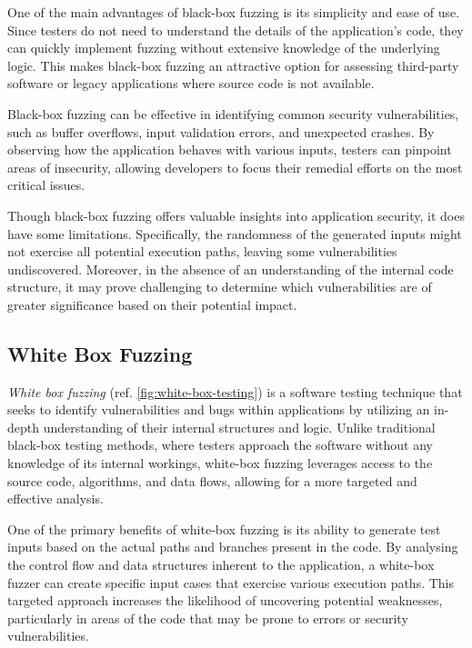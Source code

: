 One of the main advantages of black-box fuzzing is its simplicity and ease of use. Since testers do not need to understand the details of the application’s code, they can quickly implement fuzzing without extensive knowledge of the underlying logic. This makes black-box fuzzing an attractive option for assessing third-party software or legacy applications where source code is not available.

Black-box fuzzing can be effective in identifying common security vulnerabilities, such as buffer overflows, input validation errors, and unexpected crashes. By observing how the application behaves with various inputs, testers can pinpoint areas of insecurity, allowing developers to focus their remedial efforts on the most critical issues.

Though black-box fuzzing offers valuable insights into application security, it does have some limitations. Specifically, the randomness of the generated inputs might not exercise all potential execution paths, leaving some vulnerabilities undiscovered. Moreover, in the absence of an understanding of the internal code structure, it may prove challenging to determine which vulnerabilities are of greater significance based on their potential impact.
 \cite{godefroid_random_2007}

\subsection{White Box Fuzzing}
\label{sec:white-box}
\textit{White box fuzzing} (ref. \autoref{fig:white-box-testing}) is a software testing technique that seeks to identify vulnerabilities and bugs within applications by utilizing an in-depth understanding of their internal structures and logic. Unlike traditional black-box testing methods, where testers approach the software without any knowledge of its internal workings, white-box fuzzing leverages access to the source code, algorithms, and data flows, allowing for a more targeted and effective analysis.

One of the primary benefits of white-box fuzzing is its ability to generate test inputs based on the actual paths and branches present in the code. By analysing the control flow and data structures inherent to the application, a white-box fuzzer can create specific input cases that exercise various execution paths. This targeted approach increases the likelihood of uncovering potential weaknesses, particularly in areas of the code that may be prone to errors or security vulnerabilities.

